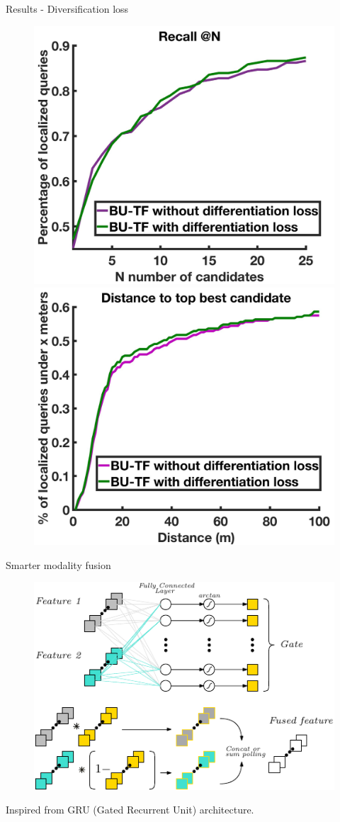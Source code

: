 \begin{frame}{Results - Diversification loss}
	\begin{figure}[t]
		\centering
		\includegraphics[width=0.499\linewidth]{images/diffloss_res/recall.jpg}\hfill
		\includegraphics[width=0.499\linewidth]{images/diffloss_res/dist.jpg}			
	\end{figure}	
\end{frame}

\begin{frame}{Smarter modality fusion}
	\begin{figure}
		\includegraphics[width=0.8\linewidth]{vect/GatedFuse.pdf}\hfill
	\end{figure}
	
	Inspired from GRU (Gated Recurrent Unit) architecture.
\end{frame}

